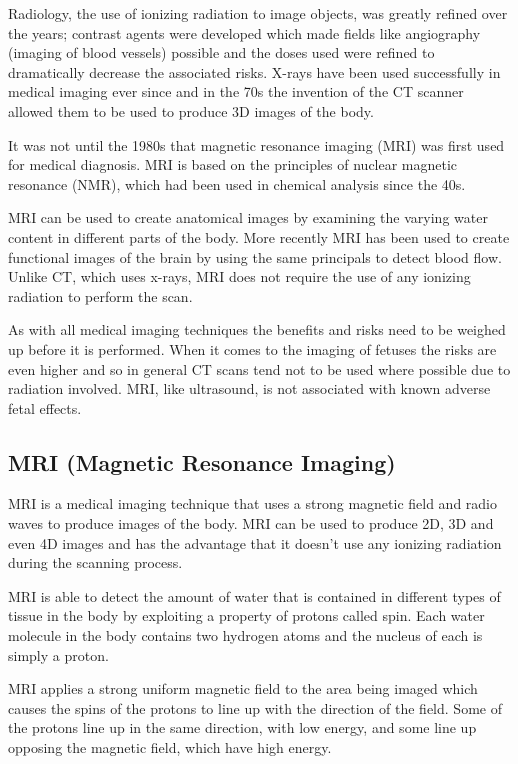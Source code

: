 \documentclass[
  oneside,
  11pt, a4paper,
  footinclude=true,
  headinclude=true,
  cleardoublepage=empty
]{scrbook}
\begin{document}
Radiology, the use of ionizing radiation to image objects, was greatly refined over the years; contrast agents were developed which made fields like angiography (imaging of blood vessels) possible\cite{infinityhistory} and the doses used were refined to dramatically decrease the associated risks. X-rays have been used successfully in medical imaging ever since and in the 70s the invention of the CT scanner allowed them to be used to produce 3D images of the body.

It was not until the 1980s that magnetic resonance imaging (MRI) was first used for medical diagnosis. MRI is based on the principles of nuclear magnetic resonance (NMR), which had been used in chemical analysis since the 40s\cite{bshr:mallard}.

MRI can be used to create anatomical images by examining the varying water content in different parts of the body. More recently MRI has been used to create functional images of the brain by using the same principals to detect blood flow\cite{fmri}. Unlike CT, which uses x-rays, MRI does not require the use of any ionizing radiation to perform the scan.

As with all medical imaging techniques the benefits and risks need to be weighed up before it is performed. When it comes to the imaging of fetuses the risks are even higher and so in general CT scans tend not to be used where possible due to radiation involved. MRI, like ultrasound, is not associated with known adverse fetal effects.\cite{pregnancyimagingguidelines}

\subsection{MRI (Magnetic Resonance Imaging)\cite{howmriworks}}

MRI is a medical imaging technique that uses a strong magnetic field and radio waves to produce images of the body. MRI can be used to produce 2D, 3D and even 4D images and has the advantage that it doesn’t use any ionizing radiation during the scanning process.

MRI is able to detect the amount of water that is contained in different types of tissue in the body by exploiting a property of protons called spin. Each water molecule in the body contains two hydrogen atoms and the nucleus of each is simply a proton.

MRI applies a strong uniform magnetic field to the area being imaged which causes the spins of the protons to line up with the direction of the field. Some of the protons line up in the same direction, with low energy, and some line up opposing the magnetic field, which have high energy.
\end{document}
